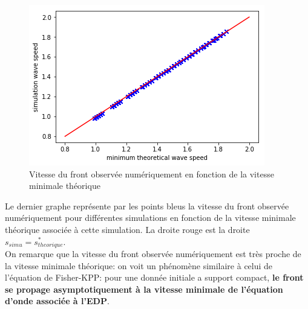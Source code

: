 \newpage
 
\begin{figure}[hbt!]
\centering
\includegraphics[width=.7\textwidth]{Images/stheoriquevssimulations.png}
\caption{Vitesse du front observée numériquement en fonction de la vitesse minimale théorique}
\end{figure}
Le dernier graphe représente par les points bleus la vitesse du front observée numériquement pour différentes simulations en fonction de la vitesse minimale théorique associée à cette simulation. La droite rouge est la droite $s_{simu} = s^*_{theorique}$.\\
On remarque que la vitesse du front observée numériquement est très proche de la vitesse minimale théorique: on voit un phénomène similaire à celui de l'équation de Fisher-KPP: pour une donnée initiale a support compact, \textbf{le front se propage asymptotiquement à la vitesse minimale de l'équation d'onde associée à l'EDP}.